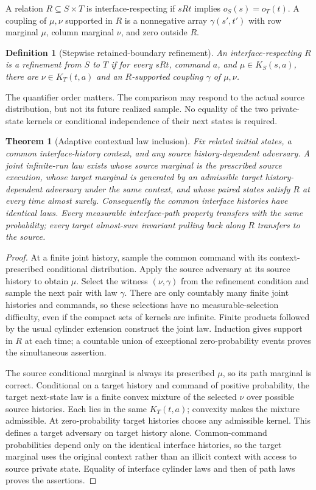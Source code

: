 \documentclass[11pt]{article}
\newtheorem{theorem}{Theorem}\newtheorem{proposition}{Proposition}\newtheorem{corollary}{Corollary}\newtheorem{definition}{Definition}
\begin{document}
A relation $R\subseteq S\times T$ is interface-respecting if $sRt$ implies $o_S(s)=o_T(t)$. A coupling of $\mu,\nu$ supported in $R$ is a nonnegative array $\gamma(s',t')$ with row marginal $\mu$, column marginal $\nu$, and zero outside $R$.

\begin{definition}[Stepwise retained-boundary refinement]
An interface-respecting $R$ is a refinement from $S$ to $T$ if for every $sRt$, command $a$, and $\mu\in K_S(s,a)$, there are $\nu\in K_T(t,a)$ and an $R$-supported coupling $\gamma$ of $\mu,\nu$.
\end{definition}

The quantifier order matters. The comparison may respond to the actual source distribution, but not its future realized sample. No equality of the two private-state kernels or conditional independence of their next states is required.

\begin{theorem}[Adaptive contextual law inclusion]\label{ref-adaptive}
Fix related initial states, a common interface-history context, and any source history-dependent adversary. A joint infinite-run law exists whose source marginal is the prescribed source execution, whose target marginal is generated by an admissible target history-dependent adversary under the same context, and whose paired states satisfy $R$ at every time almost surely. Consequently the common interface histories have identical laws. Every measurable interface-path property transfers with the same probability; every target almost-sure invariant pulling back along $R$ transfers to the source.
\end{theorem}
\begin{proof}
At a finite joint history, sample the common command with its context-prescribed conditional distribution. Apply the source adversary at its source history to obtain $\mu$. Select the witness $(\nu,\gamma)$ from the refinement condition and sample the next pair with law $\gamma$. There are only countably many finite joint histories and commands, so these selections have no measurable-selection difficulty, even if the compact sets of kernels are infinite. Finite products followed by the usual cylinder extension construct the joint law. Induction gives support in $R$ at each time; a countable union of exceptional zero-probability events proves the simultaneous assertion.

The source conditional marginal is always its prescribed $\mu$, so its path marginal is correct. Conditional on a target history and command of positive probability, the target next-state law is a finite convex mixture of the selected $\nu$ over possible source histories. Each lies in the same $K_T(t,a)$; convexity makes the mixture admissible. At zero-probability target histories choose any admissible kernel. This defines a target adversary on target history alone. Common-command probabilities depend only on the identical interface histories, so the target marginal uses the original context rather than an illicit context with access to source private state. Equality of interface cylinder laws and then of path laws proves the assertions.
\end{proof}
\end{document}
